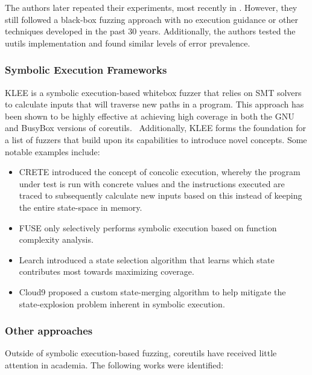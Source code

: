 \documentclass{article}
\let\savedCite=\cite
\renewcommand{\cite}{\unskip~\savedCite}
\begin{document}
\begin{multicols}{2}
    The authors later repeated their experiments, most recently in . However, they still followed a black-box fuzzing approach with no execution guidance or other techniques developed in the past 30 years. Additionally, the authors tested the uutils implementation and found similar levels of error prevalence.\cite{UNIXRevisited}

    \subsubsection{Symbolic Execution Frameworks}

    KLEE is a symbolic execution-based whitebox fuzzer that relies on SMT solvers to calculate inputs that will traverse new paths in a program. This approach has been shown to be highly effective at achieving high coverage in both the GNU and BusyBox versions of coreutils.\cite{KLEE} Additionally, KLEE forms the foundation for a list of fuzzers that build upon its capabilities to introduce novel concepts. Some notable examples include:

    \begin{itemize}
        \item CRETE introduced the concept of concolic execution, whereby the program under test is run with concrete values and the instructions executed are traced to subsequently calculate new inputs based on this instead of keeping the entire state-space in memory.\cite{CRETE}
        \item FUSE only selectively performs symbolic execution based on function complexity analysis.\cite{FUSE}
        \item Learch introduced a state selection algorithm that learns which state contributes most towards maximizing coverage.\cite{Learch}
        \item Cloud9 proposed a custom state-merging algorithm to help mitigate the state-explosion problem inherent in symbolic execution.\cite{Cloud9}
    \end{itemize}

    \subsubsection{Other approaches}

    Outside of symbolic execution-based fuzzing, coreutils have received little attention in academia. The following works were identified:


\end{multicols}
\end{document}
